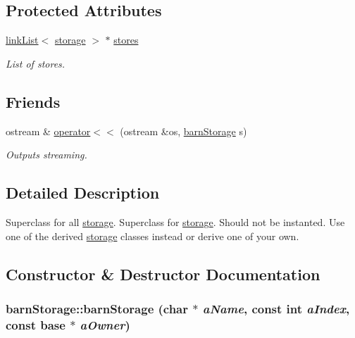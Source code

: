 \subsection*{Protected Attributes}
\begin{DoxyCompactItemize}
\item 
\hyperlink{classlink_list}{linkList}$<$ \hyperlink{classstorage}{storage} $>$ $\ast$ \hyperlink{classbarn_storage_aaa021946ef9b068d958da554fe693709}{stores}
\begin{DoxyCompactList}\small\item\em List of stores. \item\end{DoxyCompactList}\end{DoxyCompactItemize}
\subsection*{Friends}
\begin{DoxyCompactItemize}
\item 
ostream \& \hyperlink{classbarn_storage_a9ff04c29ec440b29edf27d2f31c8bcea}{operator$<$$<$} (ostream \&os, \hyperlink{classbarn_storage}{barnStorage} s)
\begin{DoxyCompactList}\small\item\em Outputs streaming. \item\end{DoxyCompactList}\end{DoxyCompactItemize}


\subsection{Detailed Description}
Superclass for all \hyperlink{classstorage}{storage}. Superclass for \hyperlink{classstorage}{storage}. Should not be instanted. Use one of the derived \hyperlink{classstorage}{storage} classes instead or derive one of your own. 

\subsection{Constructor \& Destructor Documentation}
\hypertarget{classbarn_storage_afa9fc669647e848edbb6d32475be7a22}{
\subsubsection[{barnStorage}]{\setlength{\rightskip}{0pt plus 5cm}barnStorage::barnStorage (char $\ast$ {\em aName}, \/  const int {\em aIndex}, \/  const {\bf base} $\ast$ {\em aOwner})}}
\label{classbarn_storage_afa9fc669647e848edbb6d32475be7a22}


